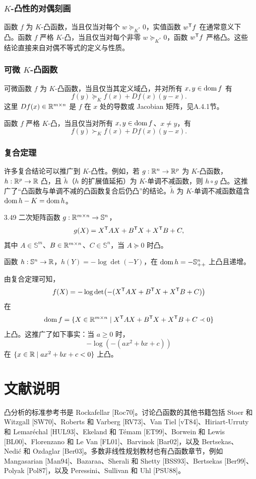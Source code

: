 \subsubsection*{$K$-凸性的对偶刻画}
函数 $f$ 为 $K$-凸函数，当且仅当对每个 $w\succeq_{K^*}0$，实值函数 $w^\mathsf T f$ 在通常意义下凸。函数 $f$ 严格 $K$-凸，当且仅当对每个非零 $w\succeq_{K^*}0$，函数 $w^\mathsf T f$ 严格凸。这些结论直接来自对偶不等式的定义与性质。
\subsubsection*{可微 $K$-凸函数}
可微函数 $f$ 为 $K$-凸函数，当且仅当其定义域凸，并对所有 $x,y\in\operatorname{dom} f$ 有
\[f(y)\succeq_K f(x)+Df(x)(y-x).\]
这里 $Df(x)\in\mathbb R^{m\times n}$ 是 $f$ 在 $x$ 处的导数或 Jacobian 矩阵，见A.4.1节。

函数 $f$ 严格 $K$-凸，当且仅当对所有 $x,y\in\operatorname{dom} f$、$x\ne y$，有
\[f(y)\succ_K f(x)+Df(x)(y-x).\]
\subsubsection*{复合定理}
许多复合结论可以推广到 $K$-凸性。例如，若 $g:\mathbb R^n\to\mathbb R^p$ 为 $K$-凸函数，$h:\mathbb R^p\to\mathbb R$ 凸，且 $\widetilde h$（$h$ 的扩展值延拓）为 $K$-单调不减函数，则 $h\circ g$ 凸。这推广了“凸函数与单调不减的凸函数复合后仍凸”的结论。$\widetilde h$ 为 $K$-单调不减函数蕴含 $\operatorname{dom} h-K=\operatorname{dom} h$。
\begin{origexample}{3.49}
二次矩阵函数 $g:\mathbb R^{m\times n}\to\mathbb S^n$，
\[g(X)=X^\mathsf T AX+B^\mathsf T X+X^\mathsf T B+C,\]
其中 $A\in\mathbb S^m$、$B\in\mathbb R^{m\times n}$、$C\in\mathbb S^n$，当 $A\succeq0$ 时凸。

函数 $h:\mathbb S^n\to\mathbb R$，$h(Y)=-\log\det(-Y)$，在 $\operatorname{dom} h=-\mathbb S_{++}^n$ 上凸且递增。

由复合定理可知，
\[f(X)=-\log\det\bigl(-(X^\mathsf T AX+B^\mathsf T X+X^\mathsf T B+C)\bigr)\]
在
\[\operatorname{dom} f=\{X\in\mathbb R^{m\times n}\mid X^\mathsf T AX+B^\mathsf T X+X^\mathsf T B+C\prec0\}\]
上凸。这推广了如下事实：当 $a\geq0$ 时，
\[-\log(-(ax^2+bx+c))\]
在 $\{x\in\mathbb R\mid ax^2+bx+c<0\}$ 上凸。
\end{origexample}
\section*{文献说明}
凸分析的标准参考书是 Rockafellar [Roc70]。讨论凸函数的其他书籍包括 Stoer 和 Witzgall [SW70]、Roberts 和 Varberg [RV73]、Van Tiel [vT84]、Hiriart-Urruty 和 Lemaréchal [HUL93]、Ekeland 和 Témam [ET99]、Borwein 和 Lewis [BL00]、Florenzano 和 Le Van [FL01]、Barvinok [Bar02]，以及 Bertsekas、Nedić 和 Ozdaglar [Ber03]。多数非线性规划教材也有凸函数章节，例如 Mangasarian [Man94]、Bazaraa、Sherali 和 Shetty [BSS93]、Bertsekas [Ber99]、Polyak [Pol87]，以及 Peressini、Sullivan 和 Uhl [PSU88]。

